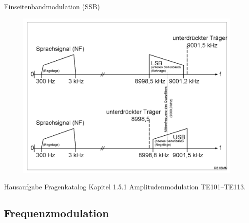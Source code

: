 \begin{frame}{Einseitenbandmodulation (SSB)}
  \begin{center}
    \begin{figure}
      \includegraphics[width=1\textwidth,height=.75\textheight,keepaspectratio]{e16/Ssb-de.png}
    \end{figure}
  \end{center}
\end{frame}

\begin{frame}
  \begin{exampleblock}{Hausaufgabe}
    Fragenkatalog Kapitel 1.5.1 Amplitudenmodulation TE101--TE113.
  \end{exampleblock}
\end{frame}

\subsection[FM]{Frequenzmodulation}

